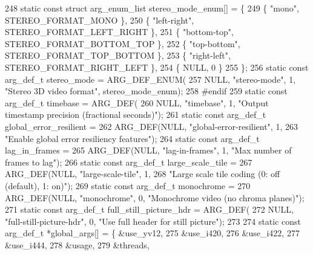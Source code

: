\begin{DoxyCodeInclude}
{{248 \textcolor{keyword}{static} \textcolor{keyword}{const} \textcolor{keyword}{struct }arg\_enum\_list stereo\_mode\_enum[] = \{
249   \{ \textcolor{stringliteral}{"mono"}, STEREO\_FORMAT\_MONO \},
250   \{ \textcolor{stringliteral}{"left-right"}, STEREO\_FORMAT\_LEFT\_RIGHT \},
251   \{ \textcolor{stringliteral}{"bottom-top"}, STEREO\_FORMAT\_BOTTOM\_TOP \},
252   \{ \textcolor{stringliteral}{"top-bottom"}, STEREO\_FORMAT\_TOP\_BOTTOM \},
253   \{ \textcolor{stringliteral}{"right-left"}, STEREO\_FORMAT\_RIGHT\_LEFT \},
254   \{ NULL, 0 \}
255 \};
256 \textcolor{keyword}{static} \textcolor{keyword}{const} arg\_def\_t stereo\_mode = ARG\_DEF\_ENUM(
257     NULL, \textcolor{stringliteral}{"stereo-mode"}, 1, \textcolor{stringliteral}{"Stereo 3D video format"}, stereo\_mode\_enum);
258 \textcolor{preprocessor}{#endif}
259 \textcolor{keyword}{static} \textcolor{keyword}{const} arg\_def\_t timebase = ARG\_DEF(
260     NULL, \textcolor{stringliteral}{"timebase"}, 1, \textcolor{stringliteral}{"Output timestamp precision (fractional seconds)"});
261 \textcolor{keyword}{static} \textcolor{keyword}{const} arg\_def\_t global\_error\_resilient =
262     ARG\_DEF(NULL, \textcolor{stringliteral}{"global-error-resilient"}, 1,
263             \textcolor{stringliteral}{"Enable global error resiliency features"});
264 \textcolor{keyword}{static} \textcolor{keyword}{const} arg\_def\_t lag\_in\_frames =
265     ARG\_DEF(NULL, \textcolor{stringliteral}{"lag-in-frames"}, 1, \textcolor{stringliteral}{"Max number of frames to lag"});
266 \textcolor{keyword}{static} \textcolor{keyword}{const} arg\_def\_t large\_scale\_tile =
267     ARG\_DEF(NULL, \textcolor{stringliteral}{"large-scale-tile"}, 1,
268             \textcolor{stringliteral}{"Large scale tile coding (0: off (default), 1: on)"});
269 \textcolor{keyword}{static} \textcolor{keyword}{const} arg\_def\_t monochrome =
270     ARG\_DEF(NULL, \textcolor{stringliteral}{"monochrome"}, 0, \textcolor{stringliteral}{"Monochrome video (no chroma planes)"});
271 \textcolor{keyword}{static} \textcolor{keyword}{const} arg\_def\_t full\_still\_picture\_hdr = ARG\_DEF(
272     NULL, \textcolor{stringliteral}{"full-still-picture-hdr"}, 0, \textcolor{stringliteral}{"Use full header for still picture"});
273 
274 \textcolor{keyword}{static} \textcolor{keyword}{const} arg\_def\_t *global\_args[] = \{ &use\_yv12,
275                                           &use\_i420,
276                                           &use\_i422,
277                                           &use\_i444,
278                                           &usage,
279                                           &threads,
}}
\end{DoxyCodeInclude}
